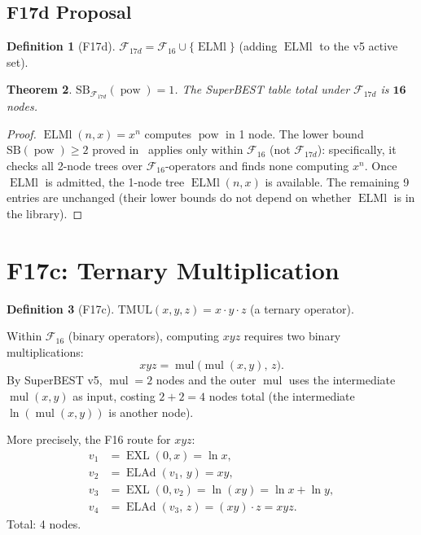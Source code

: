 \documentclass[12pt,a4paper]{article}
\newtheorem{theorem}{Theorem}[section]
\theoremstyle{definition}
\newtheorem{definition}[theorem]{Definition}
\theoremstyle{remark}
\newcommand{\EXL}{\operatorname{EXL}}
\newcommand{\ELAd}{\operatorname{ELAd}}
\newcommand{\ELMl}{\operatorname{ELMl}}
\newcommand{\mulop}{\operatorname{mul}}
\newcommand{\powop}{\operatorname{pow}}
\newcommand{\SB}{\mathrm{SB}}
\newcommand{\F}{\mathcal{F}_{16}}
\begin{document}
\subsection{F17d Proposal}

\begin{definition}[F17d]
$\mathcal{F}_{17d} = \F \cup \{\ELMl\}$ (adding $\ELMl$ to the v5 active set).
\end{definition}

\begin{theorem}
$\SB_{\mathcal{F}_{17d}}(\powop) = 1$.
The SuperBEST table total under $\mathcal{F}_{17d}$ is $\mathbf{16}$ nodes.
\end{theorem}

\begin{proof}
$\ELMl(n,x) = x^n$ computes $\powop$ in 1 node.
The lower bound $\SB(\powop)\ge 2$ proved in~\cite{SBv5} applies only within
$\F$ (not $\mathcal{F}_{17d}$): specifically, it checks all 2-node trees over
$\F$-operators and finds none computing $x^n$.  Once $\ELMl$ is admitted,
the 1-node tree $\ELMl(n,x)$ is available.
The remaining 9 entries are unchanged (their lower bounds do not depend on
whether $\ELMl$ is in the library).
\end{proof}

\section{F17c: Ternary Multiplication}
\label{sec:ternary}

\begin{definition}[F17c]
$\mathrm{TMUL}(x,y,z) = x\cdot y\cdot z$ (a ternary operator).
\end{definition}

Within $\F$ (binary operators), computing $xyz$ requires two binary
multiplications:
\[
  xyz = \mulop\!\bigl(\mulop(x,y),\,z\bigr).
\]
By SuperBEST v5, $\mulop = 2$ nodes and the outer $\mulop$ uses the
intermediate $\mulop(x,y)$ as input, costing $2+2 = 4$ nodes total
(the intermediate $\ln(\mulop(x,y))$ is another node).

More precisely, the F16 route for $xyz$:
\begin{align*}
  v_1 &= \EXL(0,x) = \ln x, \\
  v_2 &= \ELAd(v_1,\,y) = xy, \\
  v_3 &= \EXL(0,v_2) = \ln(xy) = \ln x + \ln y, \\
  v_4 &= \ELAd(v_3,\,z) = (xy)\cdot z = xyz.
\end{align*}
Total: 4 nodes.
\end{document}
